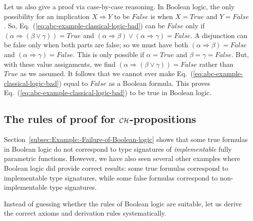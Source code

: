 Let us also give a proof via case-by-case reasoning. In Boolean logic,
the only possibility for an implication $X\Rightarrow Y$ to be $False$
is when $X=True$ and $Y=False$. So, Eq.~(\ref{eq:abc-example-classical-logic-bad})
can be $False$ only if $\left(\alpha\Rightarrow(\beta\vee\gamma)\right)=True$
and $\left(\alpha\Rightarrow\beta\right)\vee\left(\alpha\Rightarrow\gamma\right)=False$.
A disjunction can be false only when both parts are false; so we must
have both $\left(\alpha\Rightarrow\beta\right)=False$ and $\left(\alpha\Rightarrow\gamma\right)=False$.
This is only possible if $\alpha=True$ and $\beta=\gamma=False$.
But, with these value assignments, we find $\left(\alpha\Rightarrow(\beta\vee\gamma)\right)=False$
rather than $True$ as we assumed. It follows that we cannot ever
make Eq.~(\ref{eq:abc-example-classical-logic-bad}) equal to $False$
as a Boolean formula. This proves Eq.~(\ref{eq:abc-example-classical-logic-bad})
to be true in Boolean logic.

\subsection{The rules of proof for ${\cal CH}$-propositions\label{subsec:The-rules-of-proof}}

Section~\ref{subsec:Example:-Failure-of-Boolean-logic} shows that
some true formulas in Boolean logic do not correspond to type signatures
of \emph{implementable} fully parametric functions. However, we have
also seen several other examples where Boolean logic did provide correct
results: some true formulas correspond to implementable type signatures,
while some false formulas correspond to non-implementable type signatures.

Instead of guessing whether the rules of Boolean logic are suitable,
let us derive the correct axioms and derivation rules systematically.

